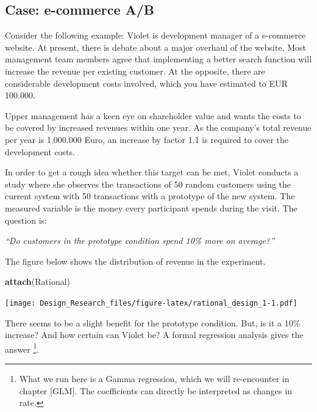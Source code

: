 \documentclass[]{svmono}
\newenvironment{Shaded}{\begin{snugshade}}{\end{snugshade}}
\newcommand{\KeywordTok}[1]{\textcolor[rgb]{0.13,0.29,0.53}{\textbf{#1}}}
\newcommand{\DataTypeTok}[1]{\textcolor[rgb]{0.13,0.29,0.53}{#1}}
\newcommand{\StringTok}[1]{\textcolor[rgb]{0.31,0.60,0.02}{#1}}
\newcommand{\OperatorTok}[1]{\textcolor[rgb]{0.81,0.36,0.00}{\textbf{#1}}}
\newcommand{\NormalTok}[1]{#1}
\theoremstyle{definition}
\theoremstyle{definition}
\theoremstyle{definition}
\theoremstyle{remark}
\begin{document}
\subsection{Case: e-commerce A/B}\label{case-e-commerce-ab}

Consider the following example: Violet is development manager of a
e-commerce website. At present, there is debate about a major overhaul
of the website. Most management team members agree that implementing a
better search function will increase the revenue per existing customer.
At the opposite, there are considerable development costs involved,
which you have estimated to EUR 100.000.

Upper management has a keen eye on shareholder value and wants the costs
to be covered by increased revenues within one year. As the company's
total revenue per year is 1.000.000 Euro, an increase by factor 1.1 is
required to cover the development costs.

In order to get a rough idea whether this target can be met, Violet
conducts a study where she observes the transactions of 50 random
customers using the current system with 50 transactions with a prototype
of the new system. The measured variable is the money every participant
spends during the visit. The question is:

\emph{``Do customers in the prototype condition spend 10\% more on
average?''}

The figure below shows the distribution of revenue in the experiment.

\begin{Shaded}
\begin{Highlighting}[]
\KeywordTok{attach}\NormalTok{(Rational)}
\end{Highlighting}
\end{Shaded}

\begin{Shaded}
\end{Shaded}

\texttt{[image: Design\_Research\_files/figure-latex/rational\_design\_1-1.pdf]}

There seems to be a slight benefit for the prototype condition. But, is
it a 10\% increase? And how certain can Violet be? A formal regression
analysis gives the answer \footnote{What we run here is a Gamma
  regression, which we will re-encounter in chapter {[}GLM{]}. The
  coefficients can directly be interpreted as changes in rate.}.
\end{document}
